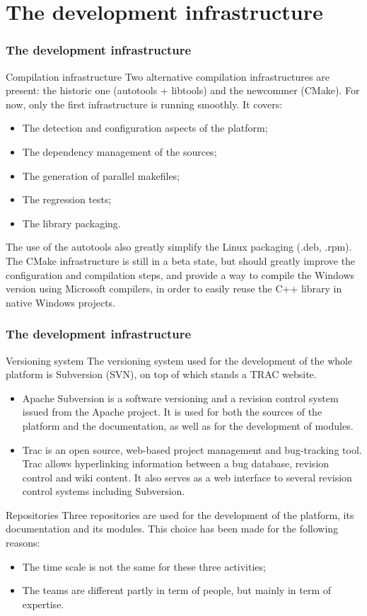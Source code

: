 \documentclass[8pt]{beamer}
\begin{document}
\section[The development infrastructure]{The development infrastructure}
\begin{frame}
  \frametitle{The development infrastructure}
  \begin{block}{Compilation infrastructure}
    Two alternative compilation infrastructures are present: the historic one (autotools + libtools) and the newcommer (CMake). For now, only the first infrastructure is running smoothly. It covers:
    \begin{itemize}
    \item The detection and configuration aspects of the platform;
    \item The dependency management of the sources;
    \item The generation of parallel makefiles;
    \item The regression tests;
    \item The library packaging.
    \end{itemize}
    The use of the autotools also greatly simplify the Linux packaging (.deb, .rpm). The CMake infrastructure is still in a beta state, but should greatly improve the configuration and compilation steps, and provide a way to compile the Windows version using Microsoft compilers, in order to easily reuse the C++ library in native Windows projects.
  \end{block}
\end{frame}
\begin{frame}
  \frametitle{The development infrastructure}
  \begin{block}{Versioning system}
    The versioning system used for the development of the whole platform is Subversion (SVN), on top of which stands a TRAC website.
    \begin{itemize}
    \item \alert{Apache Subversion} is a software versioning and a revision control system issued from the Apache project. It is used for both the sources of the platform and the documentation, as well as for the development of modules.
    \item \alert{Trac} is an open source, web-based project management and bug-tracking tool. Trac allows hyperlinking information between a bug database, revision control and wiki content. It also serves as a web interface to several revision control systems including Subversion.
    \end{itemize}
  \end{block}
  \begin{block}{Repositories}
    Three repositories are used for the development of the platform, its documentation and its modules. This choice has been made for the following reasons:
    \begin{itemize}
    \item The time scale is not the same for these three activities;
    \item The teams are different partly in term of people, but mainly in term of expertise.
    \end{itemize}
  \end{block}
\end{frame}
\end{document}
